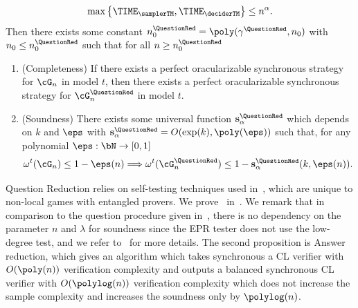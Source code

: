 \begin{proposition}
	\begin{equation*}
		\max\left\{ \TIME_{\samplerTM}, \TIME_{\deciderTM}\right\} \leq n^\alpha. 
	\end{equation*}
	Then there exists some constant $n_0^{\QuestionRed} = \poly(\gamma^{\QuestionRed}, n_0)$ with $n_0 \leq n_0^{\QuestionRed}$ such that for all $n \geq n_0^{\QuestionRed}$
	\begin{enumerate}
		\item (Completeness) If there exists a perfect oracularizable synchronous strategy for $\cG_n$ in model $t$, then there exists a perfect oracularizable synchronous strategy for $\cG^{\QuestionRed}_n$ in model $t$. 
		\item (Soundness) There exists some universal function $\mathbf{s}^{\QuestionRed}_{\alpha}$ which depends on $k$ and $\eps$ with $\mathbf{s}^{\QuestionRed}_{\alpha} = O(\exp(k), \poly(\eps))$ such that, for any polynomial $\eps: \bN \rightarrow [0,1]$ 
		\begin{equation*}
			\omega^t(\cG_n) \leq 1 - \eps(n) \Longrightarrow \omega^t(\cG^{\QuestionRed}_n) \leq 1 - \mathbf{s}^{\QuestionRed}_{\alpha}(k, \eps(n)).
		\end{equation*}
	\end{enumerate}
\end{proposition}


Question Reduction relies on self-testing techniques used in~\cite{natarajanTwoplayerEntangledGames2018,griloSimpleProtocolVerifiable2020a}, which are unique to non-local games with entangled provers. We prove~ in~. We remark that in comparison to the question procedure given in~\cite{jiMIPRE2022a}, there is no dependency on the parameter $n$ and $\lambda$ for soundness since the EPR tester does not use the low-degree test, and we refer to~ for more details. The second proposition is Answer reduction, which gives an algorithm which takes synchronous a CL verifier with $O(\poly(n))$ verification complexity and outputs a balanced synchronous CL verifier with $O(\polylog(n))$ verification complexity which does not increase the sample complexity and increases the soundness only by $\polylog(n)$.  

